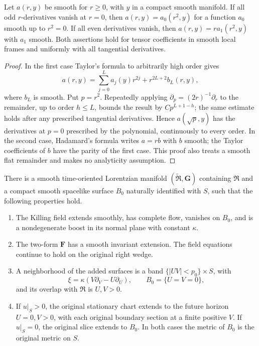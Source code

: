 \begin{lemma}\label{st:smooth-parity}
Let $a(r,y)$ be smooth for $r\geq0$, with $y$ in a compact smooth
manifold.  If all odd $r$-derivatives vanish at $r=0$, then
$a(r,y)=a_0(r^2,y)$ for a function $a_0$ smooth up to $r^2=0$.
If all even derivatives vanish, then
$a(r,y)=r a_1(r^2,y)$ with $a_1$ smooth.  Both assertions hold for
tensor coefficients in smooth local frames and uniformly with all
tangential derivatives.
\end{lemma}

\begin{proof}
In the first case Taylor's formula to arbitrarily high order gives
\[
 a(r,y)=\sum_{j=0}^{L}a_j(y)r^{2j}
                  +r^{2L+2}b_L(r,y),
\]
where $b_L$ is smooth.  Put $p=r^2$.  Repeatedly applying
$\partial_p=(2r)^{-1}\partial_r$ to the remainder, up to order
$h\leq L$, bounds the result by $C p^{L+1-h}$; the same estimate
holds after any prescribed tangential derivatives.  Hence
$a(\sqrt p,y)$ has the derivatives at $p=0$ prescribed by the
polynomial, continuously to every order.  In the second case,
Hadamard's formula writes $a=r b$ with $b$ smooth; the Taylor
coefficients of $b$ have the parity of the first case.  This proof
also treats a smooth flat remainder and makes no analyticity
assumption.
\end{proof}

\begin{proposition}\label{st:attachment}
There is a smooth time-oriented Lorentzian manifold
$(\widetilde{\mathfrak R},\mathbf G)$ containing $\mathfrak R$ and a
compact smooth spacelike surface $B_0$ naturally identified with $S$,
such that the following properties hold.
\begin{enumerate}
\item The Killing field extends smoothly, has complete flow, vanishes
on $B_0$, and is a nondegenerate boost in its normal plane with
constant $\kappa$.
\item The two-form $\mathbf F$ has a smooth invariant extension.
The field equations continue to hold on the original right wedge.
\item A neighborhood of the added surfaces is a band
$\{|UV|<p_0\}\times S$, with
\[
 \xi=\kappa(V\partial_V-U\partial_U),\qquad
 B_0=\{U=V=0\},
\]
and its overlap with $\mathfrak R$ is $U,V>0$.
\item If $u|_S>0$, the original stationary chart extends to the
future horizon $U=0,V>0$, with each original boundary section at a
finite positive $V$.  If $u|_S=0$, the original slice extends to $B_0$.
In both cases the metric of $B_0$ is the original metric on $S$.
\end{enumerate}
\end{proposition}

